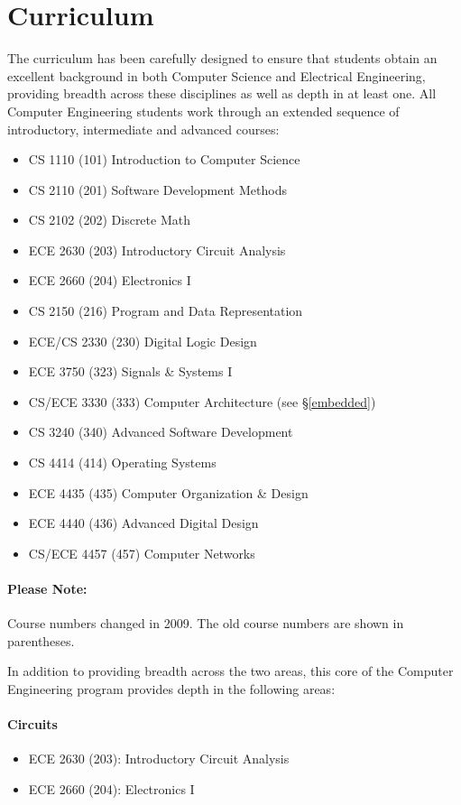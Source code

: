 \documentclass[10pt,letter]{book}
\newenvironment{itemlist}{
\begin{itemize}
\setlength{\itemsep}{0pt}
\setlength{\parskip}{0pt}}
{\end{itemize}}
\newcommand{\mysection}[1]{\section{#1}\renewcommand{\rightmark}{#1}}
\begin{document}
\mysection{Curriculum} %

The curriculum has been carefully designed to ensure that students
obtain an excellent background in both Computer Science and Electrical
Engineering, providing breadth across these disciplines as well as
depth in at least one. All Computer Engineering students work through
an extended sequence of introductory, intermediate and advanced
courses:

\begin{itemlist}
\item CS 1110 (101) Introduction to Computer Science
\item CS 2110 (201) Software Development Methods
\item CS 2102 (202) Discrete Math
\item ECE 2630 (203) Introductory Circuit Analysis
\item ECE 2660 (204) Electronics I
\item CS 2150 (216) Program and Data Representation
\item ECE/CS 2330 (230) Digital Logic Design
\item ECE 3750 (323) Signals \& Systems I
\item CS/ECE 3330 (333) Computer Architecture (see \S\ref{embedded})
\item CS 3240 (340) Advanced Software Development
\item CS 4414 (414) Operating Systems
\item ECE 4435 (435) Computer Organization \& Design
\item ECE 4440 (436) Advanced Digital Design
\item CS/ECE 4457 (457) Computer Networks
\end{itemlist}

\paragraph{Please Note:} Course numbers changed in 2009. The old 
course numbers are shown in parentheses.

In addition to providing breadth across the two areas,
this core of the Computer Engineering program provides
depth in the following areas:

\paragraph{Circuits}
\begin{itemlist}
\item ECE 2630 (203): Introductory Circuit Analysis
\item ECE 2660 (204): Electronics I
\end{itemlist}
\end{document}
